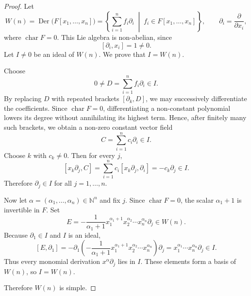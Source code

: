 \begin{proof}
    Let
    \[
        W(n)=\operatorname{Der}\bigl(F[x_1,\dots,x_n]\bigr)
        =\left\{\sum_{i=1}^n f_i\partial_i \;\middle|\; f_i\in F[x_1,\dots,x_n]\right\},
        \qquad \partial_i=\frac{\partial}{\partial x_i},
    \]
    where $\operatorname{char}F=0$. This Lie algebra is non-abelian, since
    \[
        [\partial_i,x_i]=1\neq0.
    \]
    Let $I\neq0$ be an ideal of $W(n)$. We prove that $I=W(n)$.

    Choose
    \[
        0\neq D=\sum_{i=1}^n f_i\partial_i\in I.
    \]
    By replacing $D$ with repeated brackets $[\partial_k,D]$, we may successively differentiate the coefficients. Since $\operatorname{char}F=0$, differentiating a non-constant polynomial lowers its degree without annihilating its highest term. Hence, after finitely many such brackets, we obtain a non-zero constant vector field
    \[
        C=\sum_{i=1}^n c_i\partial_i\in I.
    \]
    Choose $k$ with $c_k\neq0$. Then for every $j$,
    \[
        [x_k\partial_j,C]
        =\sum_{i=1}^n c_i[x_k\partial_j,\partial_i]
        =-c_k\partial_j\in I.
    \]
    Therefore $\partial_j\in I$ for all $j=1,\dots,n$.

    Now let $\alpha=(\alpha_1,\dots,\alpha_n)\in \mathbb{N}^n$ and fix $j$. Since $\operatorname{char}F=0$, the scalar $\alpha_1+1$ is invertible in $F$. Set
    \[
        E=-\frac{1}{\alpha_1+1}x_1^{\alpha_1+1}x_2^{\alpha_2}\cdots x_n^{\alpha_n}\partial_j\in W(n).
    \]
    Because $\partial_1\in I$ and $I$ is an ideal,
    \[
        [E,\partial_1]
        =-\partial_1\!\left(-\frac{1}{\alpha_1+1}x_1^{\alpha_1+1}x_2^{\alpha_2}\cdots x_n^{\alpha_n}\right)\partial_j
        =x_1^{\alpha_1}\cdots x_n^{\alpha_n}\partial_j
        \in I.
    \]
    Thus every monomial derivation $x^\alpha\partial_j$ lies in $I$. These elements form a basis of $W(n)$, so $I=W(n)$.

    Therefore $W(n)$ is simple.
\end{proof}

